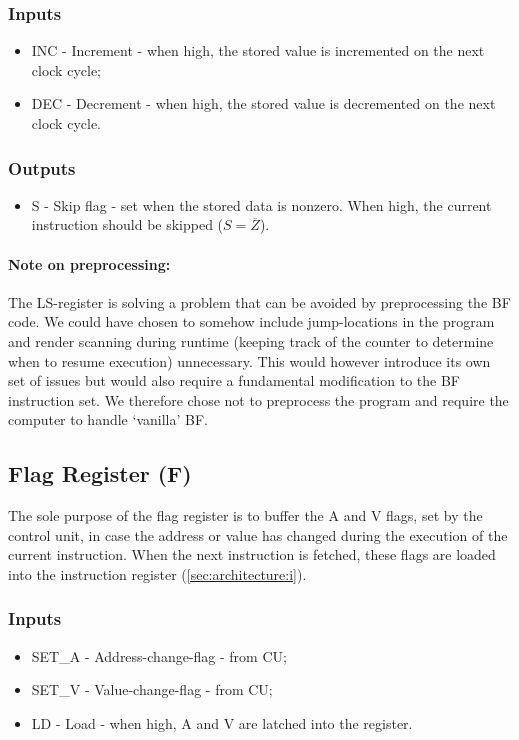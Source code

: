 \subsubsection*{Inputs}
\begin{itemize}
\itemsep0em 
\item INC - Increment - when high, the stored value is incremented on the next clock cycle;
\item DEC - Decrement - when high, the stored value is decremented on the next clock cycle.
\end{itemize}

\subsubsection*{Outputs}
\begin{itemize}
\itemsep0em 
\item S - Skip flag - set when the stored data is nonzero. When high, the current instruction should be skipped ($S = \overline{Z}$).
\end{itemize}

\paragraph{Note on preprocessing:} The LS-register is solving a problem that can be avoided by preprocessing the BF code. We could have chosen to somehow include jump-locations in the program and render scanning during runtime (keeping track of the counter to determine when to resume execution) unnecessary. This would however introduce its own set of issues but would also require a fundamental modification to the BF instruction set. We therefore chose not to preprocess the program and require the computer to handle `vanilla' BF.

\subsection{Flag Register (F)} \label{sec:architecture:f}
The sole purpose of the flag register is to buffer the A and V flags, set by the control unit, in case the address or value has changed during the execution of the current instruction. When the next instruction is fetched, these flags are loaded into the instruction register (\ref{sec:architecture:i}). 

\subsubsection*{Inputs}
\begin{itemize}
\itemsep0em 
\item SET\_A - Address-change-flag - from CU;
\item SET\_V - Value-change-flag - from CU;
\item LD - Load - when high, A and V are latched into the register.
\end{itemize}

